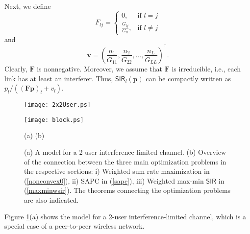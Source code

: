 \documentclass[10pt,twocolumn]{IEEEtran}
\newcommand{\0}{\mathbf{0}}
\newcommand{\1}{\mathbf{1}}
\newcommand{\trans}{^\top}
\begin{document}
Next, we define
\begin{equation}
\label{matrixF}
F_{lj}=\left\{\begin{array}{cl}
    0, & \mbox{if} \,\, l = j \\
    \frac{G_{lj}}{G_{ll}}, & \mbox{if} \,\, l \ne j
       \end{array}\right.
\end{equation}
and
\begin{equation}
\mathbf{v}= \displaystyle \left(\frac{n_1}{G_{11}}, \frac{n_2}{G_{22}}, \dots,\frac{n_L}{G_{LL}} \right)^{\trans}.
\end{equation}
Clearly, $\mathbf{F}$ is nonnegative. Moreover, we assume that $\mathbf{F}$ is irreducible, i.e., each link has at least an interferer. Thus, $\mathsf{SIR}_l(\mathbf{p})$ can be compactly written as $p_l/((\mathbf{F}\mathbf{p})_l+v_l)$.
\begin{figure}
\begin{minipage}[t]{1.7in}
\begin{center}
\texttt{[image: 2x2User.ps]}
\end{center}
\end{minipage}
\begin{minipage}[t]{1.7in}
\begin{center}
\texttt{[image: block.ps]}
\end{center}
\end{minipage}
\begin{center}
(a) \hspace{1.5in} (b)
\end{center}
\caption{\scriptsize{(a) A model for a 2-user interference-limited channel. (b) Overview of the connection between the three main optimization problems in the respective sections: i) Weighted sum rate maximization in (\ref{nonconvex0}), ii) SAPC in (\ref{sapc}), iii) Weighted max-min $\mathsf{SIR}$ in (\ref{maxminwsir}). The theorems connecting the optimization problems are also indicated.}} \label{figoverview}
\end{figure}

Figure \ref{figoverview}(a) shows the model for a 2-user interference-limited channel, which is a special case of a peer-to-peer wireless network.
\end{document}

